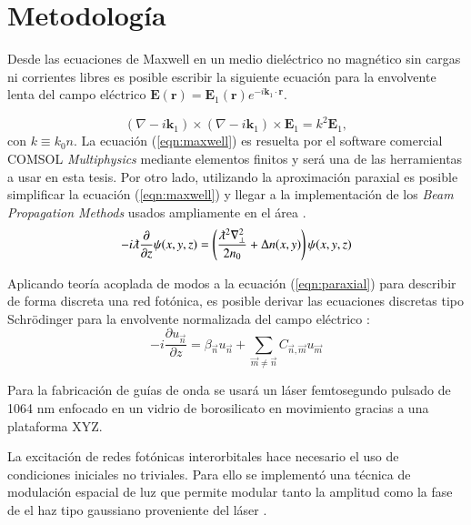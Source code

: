 \documentclass{article}
\begin{document}
\section{Metodología}

Desde las ecuaciones de Maxwell en un medio dieléctrico no magnético sin cargas ni corrientes libres es posible escribir la siguiente ecuación para la envolvente lenta del campo eléctrico $\textbf{E}(\textbf{r}) = \textbf{E}_1(\textbf{r}) e^{-i \textbf{k}_1 \cdot \textbf{r}}$.

\begin{equation}
	(\nabla-i\textbf{k}_1)\times(\nabla-i\textbf{k}_1)\times \textbf{E}_1 = k^2 \textbf{E}_1,
	 \label{eqn:maxwell}
\end{equation}
con $k \equiv k_0 n$.
La ecuación (\ref{eqn:maxwell}) es resuelta por el software comercial COMSOL \textit{Multiphysics} mediante elementos finitos y será una de las herramientas a usar en esta tesis. Por otro lado, utilizando la aproximación paraxial es posible simplificar la ecuación (\ref{eqn:maxwell}) y llegar a la implementación de los \textit{Beam Propagation Methods} usados ampliamente en el área \cite{bics, interorbital, OAMCaging, vortex, bpm}.
\begin{equation}
	-i\lambdabar\frac{\partial}{\partial z}\psi(x,y,z) = \left(\frac{\lambdabar^2\nabla_\perp^2}{2n_0} + \Delta n(x,y)\right) \psi (x,y,z) \label{eqn:paraxial}
\end{equation}

Aplicando teoría acoplada de modos a la ecuación (\ref{eqn:paraxial}) para describir de forma discreta una red fotónica, es posible derivar las ecuaciones discretas tipo Schrödinger para la envolvente normalizada del campo eléctrico \cite{discretesolitons}:
\begin{equation}
	-i\frac{\partial u_{\vec{n}} }{\partial z} = \beta_{\vec{n}}u_{\vec{n}} + \sum_{\vec{m}\neq\vec{n}} C_{\vec{n},\vec{m}}u_{\vec{m}} \label{eqn:CMT}
\end{equation}

Para la fabricación de guías de onda se usará un láser femtosegundo pulsado de 1064 nm enfocado en un vidrio de borosilicato en movimiento gracias a una plataforma XYZ.


La excitación de redes fotónicas interorbitales hace necesario el uso de condiciones iniciales no triviales. Para ello se implementó una técnica de modulación espacial de luz que permite modular tanto la amplitud como la fase de el haz tipo gaussiano proveniente del láser \cite{slm}.
\end{document}
